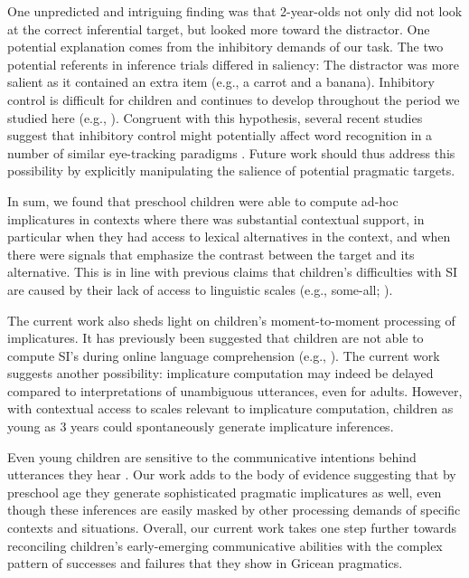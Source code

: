 \documentclass[10pt,letterpaper]{article}
\begin{document}
One unpredicted and intriguing finding was that 2-year-olds not only did not look at the correct inferential target, but looked more toward the distractor. One potential explanation comes from the inhibitory demands of our task. The two potential referents in inference trials differed in saliency: The distractor was more salient as it contained an extra item (e.g., a carrot and a banana). Inhibitory control is difficult for children and continues to develop throughout the period we studied here (e.g.,  ). Congruent with this hypothesis, several recent studies suggest that inhibitory control might potentially affect word recognition in a number of similar eye-tracking paradigms \cite{yurovskybeyond,nordmeyer2013measuring}. Future work should thus address this possibility by explicitly manipulating the salience of potential pragmatic targets.

In sum, we found that preschool children were able to compute ad-hoc implicatures in contexts where there was substantial contextual support, in particular when they had access to lexical alternatives in the context, and when there were signals that emphasize the contrast between the target and its alternative. This is in line with previous claims that children's difficulties with SI are caused by their lack of access to linguistic scales (e.g., some-all; ). 

The current work also sheds light on children's moment-to-moment processing of implicatures. It has previously been suggested that children are not able to compute SI's during online language comprehension (e.g., ). The current work suggests another possibility: implicature computation may indeed be delayed compared to interpretations of unambiguous utterances, even for adults. However, with contextual access to scales relevant to implicature computation, children as young as 3 years could spontaneously generate implicature inferences. 

Even young children are sensitive to the communicative intentions behind utterances they hear \cite{clark2009first,baldwin1993early}. Our work adds to the body of evidence suggesting that by preschool age they generate sophisticated pragmatic implicatures as well, even though these inferences are easily masked by other processing demands of specific contexts and situations. Overall, our current work takes one step further towards reconciling children's early-emerging communicative abilities with the complex pattern of successes and failures that they show in Gricean pragmatics.
\end{document}

